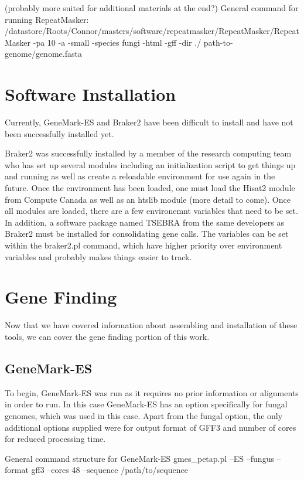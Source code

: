 \documentclass[12pt]{article}
\begin{document}
(probably more suited for additional materials at the end?)
General command for running RepeatMasker:
/datastore/Roots/Connor/masters/software/repeatmasker/RepeatMasker/RepeatMasker
-pa 10 -a -small -species fungi -html -gff -dir ./
path-to-genome/genome.fasta


\section{Software Installation}

Currently, GeneMark-ES and Braker2 have been difficult to install and
have not been successfully installed yet.

Braker2 was successfully installed by a member of the research
computing team who has set up several modules including an
initialization script to get things up and running as well as create a
reloadable environment for use again in the future. Once the
environment has been loaded, one must load the Hisat2 module from
Compute Canada as well as an htslib module (more detail to come). Once
all modules are loaded, there are a few environemnt variables that
need to be set. In addition, a software package named TSEBRA from the
same developers as Braker2 must be installed for consolidating gene
calls. The variables can be set within the braker2.pl command, which
have higher priority over environment variables and probably makes
things easier to track.

\section{Gene Finding}

Now that we have covered information about assembling and installation
of these tools, we can cover the gene finding portion of this work.

\subsection{GeneMark-ES}

To begin, GeneMark-ES was run as it requires no prior information or
alignments in order to run. In this case GeneMark-ES has an option
specifically for fungal genomes, which was used in this case. Apart
from the fungal option, the only additional options supplied were for
output format of GFF3 and number of cores for reduced processing time.

General command structure for GeneMark-ES gmes\_petap.pl --ES --fungus
--format gff3 --cores 48 --sequence /path/to/sequence
\end{document}
